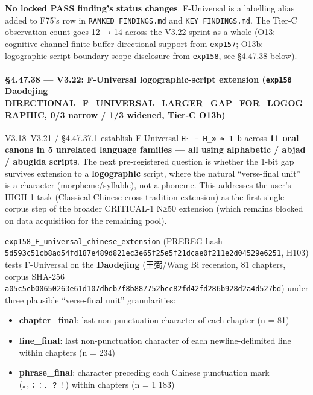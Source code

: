 \documentclass[
]{article}
\providecommand{\tightlist}{%
  \setlength{\itemsep}{0pt}\setlength{\parskip}{0pt}}
\begin{document}
\textbf{No locked PASS finding's status changes}. F-Universal is a
labelling alias added to F75's row in \texttt{RANKED\_FINDINGS.md} and
\texttt{KEY\_FINDINGS.md}. The Tier-C observation count goes 12 → 14
across the V3.22 sprint as a whole (O13: cognitive-channel finite-buffer
directional support from \texttt{exp157}; O13b:
logographic-script-boundary scope disclosure from \texttt{exp158}, see
§4.47.38 below).

\paragraph{\texorpdfstring{§4.47.38 --- V3.22: F-Universal
logographic-script extension (\texttt{exp158} Daodejing ---
\textbf{DIRECTIONAL\_F\_UNIVERSAL\_LARGER\_GAP\_FOR\_LOGOGRAPHIC}, 0/3
narrow / 1/3 widened, Tier-C
O13b)}{§4.47.38 --- V3.22: F-Universal logographic-script extension (exp158 Daodejing --- DIRECTIONAL\_F\_UNIVERSAL\_LARGER\_GAP\_FOR\_LOGOGRAPHIC, 0/3 narrow / 1/3 widened, Tier-C O13b)}}\label{v3.22-f-universal-logographic-script-extension-exp158-daodejing-directional_f_universal_larger_gap_for_logographic-03-narrow-13-widened-tier-c-o13b}

V3.18--V3.21 / §4.47.37.1 establish F-Universal
\texttt{H₁\ −\ H\_∞\ ≈\ 1\ b} across \textbf{11 oral canons in 5
unrelated language families --- all using alphabetic / abjad / abugida
scripts}. The next pre-registered question is whether the 1-bit gap
survives extension to a \textbf{logographic} script, where the natural
``verse-final unit'' is a character (morpheme/syllable), not a phoneme.
This addresses the user's HIGH-1 task (Classical Chinese cross-tradition
extension) as the first single-corpus step of the broader CRITICAL-1
N≥50 extension (which remains blocked on data acquisition for the
remaining pool).

\texttt{exp158\_F\_universal\_chinese\_extension} (PREREG hash
\texttt{5d593c51cb8ad54fd187e489d821ec3e65f25e5f21dcae0f211e2d04529e6251},
H103) tests F-Universal on the \textbf{Daodejing} (王弼/Wang Bi
recension, 81 chapters, corpus SHA-256
\texttt{a05c5cb00650263e61d107dbeb7f8b887752bcc82fd42fd286b928d2a4d527bd})
under three plausible ``verse-final unit'' granularities:

\begin{itemize}
\tightlist
\item
  \textbf{chapter\_final}: last non-punctuation character of each
  chapter (n = 81)
\item
  \textbf{line\_final}: last non-punctuation character of each
  newline-delimited line within chapters (n = 234)
\item
  \textbf{phrase\_final}: character preceding each Chinese punctuation
  mark (\texttt{。，；：、？！}) within chapters (n = 1 183)
\end{itemize}
\end{document}
